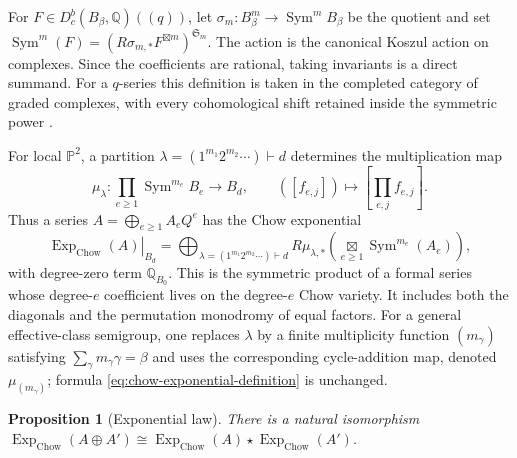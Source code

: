 \documentclass[11pt,reqno]{amsart}
\newtheorem{proposition}[theorem]{Proposition}
\theoremstyle{definition}
\newcommand{\Q}{\mathbb Q}
\newcommand{\Pp}{\mathbb P}
\newcommand{\ExpChow}{\operatorname{Exp}_{\mathrm{Chow}}}
\newcommand{\bigboxtimes}{\mathop{\boxtimes}\limits}
\begin{document}
For $F\in D_c^b(B_\beta,\Q)((q))$, let
$\sigma_m:B_\beta^m\to\operatorname{Sym}^mB_\beta$ be the quotient and set
$\operatorname{Sym}^m(F)=(R\sigma_{m,*}F^{\boxtimes m})^{\mathfrak S_m}$.
The action is the canonical Koszul action on complexes.  Since the
coefficients are rational, taking invariants is a direct summand.  For a
$q$-series this definition is taken in the completed category of graded
complexes, with every cohomological shift retained inside the symmetric
power \cite{MaximSaitoSchurmann}.

For local $\Pp^2$, a partition
$\lambda=(1^{m_1}2^{m_2}\cdots)\vdash d$ determines the multiplication map
\begin{equation}\label{eq:chow-partition-map}
 \mu_\lambda:
 \prod_{e\ge1}\operatorname{Sym}^{m_e}B_e\longrightarrow B_d,
 \qquad ([f_{e,j}])\longmapsto\left[\prod_{e,j}f_{e,j}\right].
\end{equation}
Thus a series $A=\bigoplus_{e\ge1}A_eQ^e$ has the Chow exponential
\begin{equation}\label{eq:chow-exponential-definition}
 \left.\ExpChow(A)\right|_{B_d}
 =\bigoplus_{\lambda=(1^{m_1}2^{m_2}\cdots)\vdash d}
 R\mu_{\lambda,*}
 \left(\bigboxtimes_{e\ge1}\operatorname{Sym}^{m_e}(A_e)\right),
\end{equation}
with degree-zero term $\Q_{B_0}$.  This is the symmetric product of a
formal series whose degree-$e$ coefficient lives on the degree-$e$ Chow
variety.  It includes both the diagonals and the permutation monodromy of
equal factors.  For a general effective-class semigroup, one replaces
$\lambda$ by a finite multiplicity function $(m_\gamma)$ satisfying
$\sum_\gamma m_\gamma\gamma=\beta$ and uses the corresponding cycle-addition
map, denoted $\mu_{(m_\gamma)}$; formula
\eqref{eq:chow-exponential-definition} is unchanged.

\begin{proposition}[Exponential law]\label{prop:chow-exponential-law}
There is a natural isomorphism
$\ExpChow(A\oplus A')\cong\ExpChow(A)\star\ExpChow(A')$.
\end{proposition}
\end{document}
